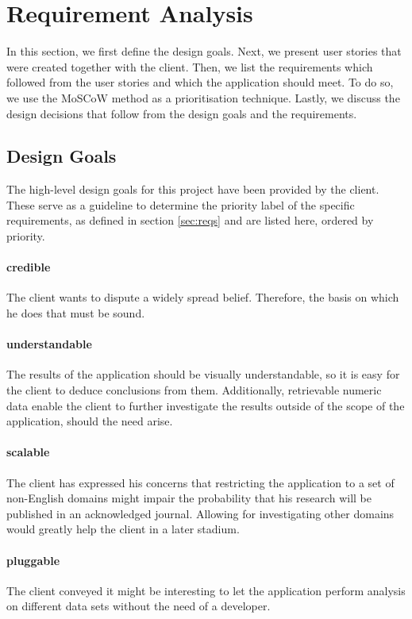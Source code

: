 \section {Requirement Analysis}\label{sec:reqs-analysis}
In this section, we first define the design goals. Next, we present user stories that were created together with the client. Then, we list the requirements which followed from the user stories and which the application should meet. To do so, we use the MoSCoW method\cite{clegg1994case} as a prioritisation technique. Lastly, we discuss the design decisions that follow from the design goals and the requirements.

\subsection{Design Goals} \label{sec:design-goals}
The high-level design goals for this project have been provided by the client. These serve as a guideline to determine the priority label of the specific requirements, as defined in section \ref{sec:reqs} and are listed here, ordered by priority.

\paragraph{credible} The client wants to dispute a widely spread belief. Therefore, the basis on which he does that must be sound.
\paragraph{understandable} The results of the application should be visually understandable, so it is easy for the client to deduce conclusions from them. Additionally, retrievable numeric data enable the client to further investigate the results outside of the scope of the application, should the need arise.
\paragraph{scalable} The client has expressed his concerns that restricting the application to a set of non-English domains might impair the probability that his research will be published in an acknowledged journal. Allowing for investigating other domains would greatly help the client in a later stadium.
\paragraph{pluggable} The client conveyed it might be interesting to let the application perform analysis on different data sets without the need of a developer. 
